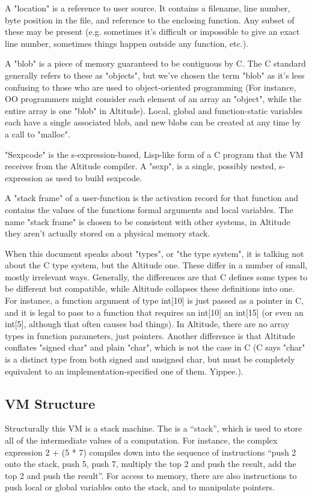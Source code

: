 \documentclass[10pt,a4paper]{report}
\begin{document}
A "location" is a reference to user source. It contains a filename, line number, byte position in the file, and reference to the enclosing function. Any subset of these may be present (e.g. sometimes it's difficult or impossible to give an exact line number, sometimes things happen outside any function, etc.).

A "blob" is a piece of memory guaranteed to be contiguous by C. The C standard generally refers to these as "objects", but we've chosen the term "blob" as it's less confusing to those who are used to object-oriented programming (For instance, OO programmers might consider each element of an array an "object", while the entire array is one "blob" in Altitude). Local, global and function-static variables each have a single associated blob, and new blobs can be created at any time by a call to "malloc".

"Sexpcode" is the s-expression-based, Lisp-like form of a C program that the VM receives from the Altitude compiler. A "sexp", is a single, possibly nested, s-expression as used to build sexpcode.

A "stack frame" of a user-function is the activation record for that function and contains the values of the functions formal arguments and local variables. The name "stack frame" is chosen to be consistent with other systems, in Altitude they aren't actually stored on a physical memory stack.

When this document speaks about "types", or "the type system", it is talking not about the C type system, but the Altitude one. These differ in a number of small, mostly irrelevant ways. Generally, the differences are that C defines some types to be different but compatible, while Altitude collapses these definitions into one. For instance, a function argument of type int[10] is just passed as a pointer in C, and it is legal to pass to a function that requires an int[10] an int[15] (or even an int[5], although that often causes bad things). In Altitude, there are no array types in function parameters, just pointers. Another difference is that Altitude conflates "signed char" and plain "char", which is not the case in C (C says "char" is a distinct type from both signed and unsigned char, but must be completely equivalent to an implementation-specified one of them. Yippee.).


\subsection{VM Structure}
Structurally this VM is a stack machine. The is a ``stack'', which is used to store all of the intermediate values of a computation. For instance, the complex expression 2 + (5 * 7) compiles down into the sequence of instructions ``push 2 onto the stack, push 5, push 7, multiply the top 2 and push the result, add the top 2 and push the result''. For access to memory, there are also instructions to push local or global variables onto the stack, and to manipulate pointers.
\end{document}
